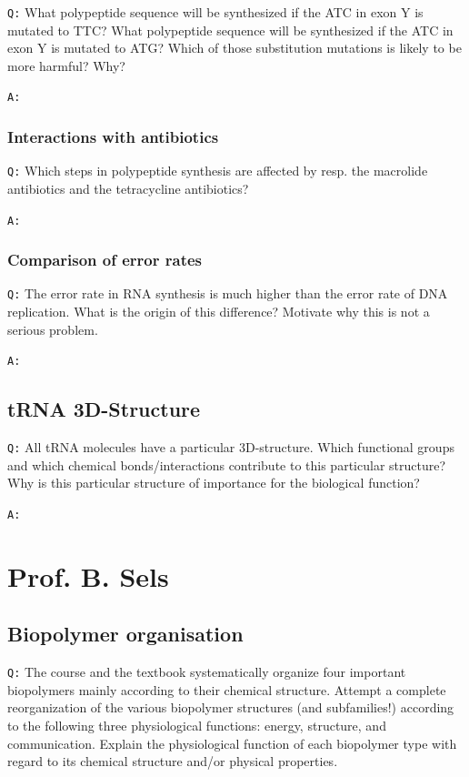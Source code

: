 \documentclass[11pt, a4paper,titlepage]{article}
\begin{document}
\texttt{Q:} What polypeptide sequence will be synthesized if the ATC in exon
Y is mutated to TTC? What polypeptide sequence will be synthesized if
the ATC in exon Y is mutated to ATG? Which of those substitution
mutations is likely to be more harmful? Why?

\texttt{A:}
\subsubsection{Interactions with antibiotics}
\label{sec-1-2-4}

\texttt{Q:} Which steps in polypeptide synthesis are affected by resp. the
macrolide antibiotics and the tetracycline antibiotics?

\texttt{A:}
\subsubsection{Comparison of error rates}
\label{sec-1-2-5}

\texttt{Q:} The error rate in RNA synthesis is much higher than the error rate
of DNA replication. What is the origin of this difference? Motivate
why this is not a serious problem.

\texttt{A:}
\subsection{tRNA 3D-Structure}
\label{sec-1-3}

\texttt{Q:} All tRNA molecules have a particular 3D-structure. Which
functional groups and which chemical bonds/interactions contribute to
this particular structure? Why is this particular structure of
importance for the biological function?

\texttt{A:}
\section{Prof. B. Sels}
\label{sec-2}
\subsection{Biopolymer organisation}
\label{sec-2-1}

\texttt{Q:} The course and the textbook systematically organize four important
biopolymers mainly according to their chemical structure. Attempt a
complete reorganization of the various biopolymer structures (and
subfamilies!) according to the following three physiological
functions: energy, structure, and communication. Explain the
physiological function of each biopolymer type with regard to its
chemical structure and/or physical properties.
\end{document}
